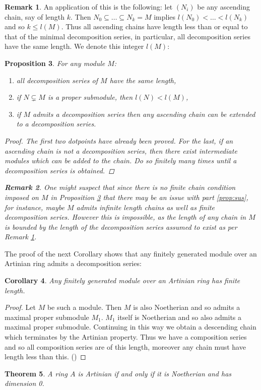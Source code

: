 \documentclass[12pt]{article}
\theoremstyle{plain}
\newtheorem{thm}{Theorem}[subsection] %
\newtheorem{proposition}[thm]{Proposition}
\newtheorem{cor}[thm]{Corollary}
\theoremstyle{definition}
\newtheorem{remark}[thm]{Remark}
\begin{document}
\begin{remark}
\label{remark:saving_grace}
An application of this is the following: let $(N_i)$ be any ascending chain, say of length $k$. Then $N_0 \subseteq \hdots \subseteq N_k = M$ implies $l(N_0) < \hdots < l(N_k)$ and so $k \leq l(M)$. Thus all ascending chains have length less than or equal to that of the minimal decomposition series, in particular, all decomposition series have the same length. We denote this integer $l(M)$:
\end{remark}
\begin{proposition}
\label{prop:decomposition_series_basics}
For any module $M$:
\begin{enumerate}
    \item all decomposition series of $M$ have the same length,
    \item if $N \subsetneq M$ is a proper submodule, then $l(N)<l(M)$,
    \item\label{prop:sus} if $M$ admits a decomposition series then any ascending chain can be extended to a decomposition series.
\end{enumerate}
\begin{proof}
The first two dotpoints have already been proved. For the last, if an ascending chain is not a decomposition series, then there exist intermediate modules which can be added to the chain. Do so finitely many times until a decomposition series is obtained.
\end{proof}
\begin{remark}
One might suspect that since there is no finite chain condition imposed on $M$ in Proposition \ref{prop:decomposition_series_basics} that there may be an issue with part \ref{prop:sus}, for instance, maybe $M$ admits infinite length chains as well as finite decomposition series. However this is impossible, as the length of any chain in $M$ is bounded by the length of the decomposition series assumed to exist as per Remark \ref{remark:saving_grace}.
\end{remark}
\end{proposition}
The proof of the next Corollary shows that any finitely generated module over an Artinian ring admits a decomposition series:
\begin{cor}
Any finitely generated module over an Artinian ring has finite length.
\end{cor}
\begin{proof}
Let $M$ be such a module. Then $M$ is also Noetherian and so admits a maximal proper submodule $M_1$. $M_1$ itself is Noetherian and so also admits a maximal proper submodule. Continuing in this way we obtain a descending chain which terminates by the Artinian property. Thus we have a composition series and so all composition series are of this length, moreover any chain must have length less than this. (\cite[\S 6]{atiyah_macdonald})
\end{proof}
\begin{thm}
\label{prop:artinian_Noeth_dimzero} A ring $A$ is Artinian if and only if it is Noetherian and has dimension 0.
\end{thm}
\end{document}
